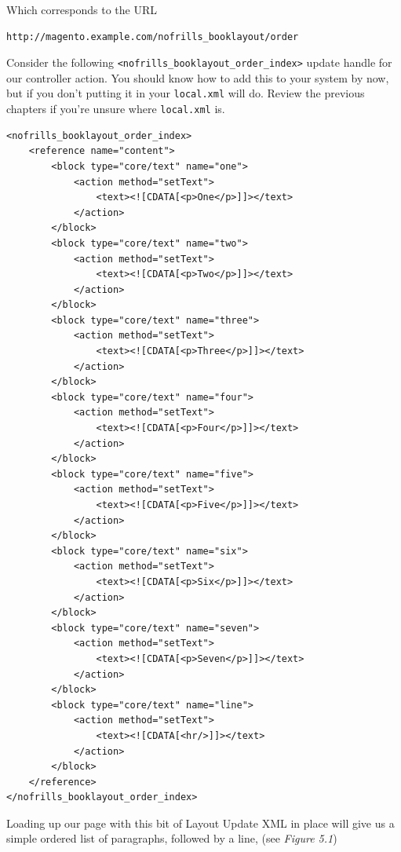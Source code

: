 \documentclass[oneside]{book}
\begin{document}
Which corresponds to the URL

\begin{lstlisting}
http://magento.example.com/nofrills_booklayout/order    

\end{lstlisting}


Consider the following \footnotesize\texttt{\textless nofrills\_booklayout\_order\_index\textgreater } \normalsize  update handle for our controller action.  You should know how to add this to your system by now, but if you don't putting it in your \footnotesize\texttt{local.xml} \normalsize  will do.  Review the previous chapters if you're unsure where \footnotesize\texttt{local.xml} \normalsize  is.

\begin{lstlisting}
<nofrills_booklayout_order_index>
    <reference name="content">
        <block type="core/text" name="one">
            <action method="setText">
                <text><![CDATA[<p>One</p>]]></text>
            </action>
        </block>
        <block type="core/text" name="two">
            <action method="setText">
                <text><![CDATA[<p>Two</p>]]></text>
            </action>
        </block>
        <block type="core/text" name="three">
            <action method="setText">
                <text><![CDATA[<p>Three</p>]]></text>
            </action>
        </block>
        <block type="core/text" name="four">
            <action method="setText">
                <text><![CDATA[<p>Four</p>]]></text>
            </action>
        </block>
        <block type="core/text" name="five">
            <action method="setText">
                <text><![CDATA[<p>Five</p>]]></text>
            </action>
        </block>            
        <block type="core/text" name="six">
            <action method="setText">
                <text><![CDATA[<p>Six</p>]]></text>
            </action>
        </block>                        
        <block type="core/text" name="seven">
            <action method="setText">
                <text><![CDATA[<p>Seven</p>]]></text>
            </action>
        </block>                            
        <block type="core/text" name="line">
            <action method="setText">
                <text><![CDATA[<hr/>]]></text>
            </action>
        </block>                                                    
    </reference>
</nofrills_booklayout_order_index>

\end{lstlisting}


Loading up our page with this bit of Layout Update XML in place will give us a simple ordered list of paragraphs, followed by a line, (see \emph{Figure 5.1}) 
\end{document}
